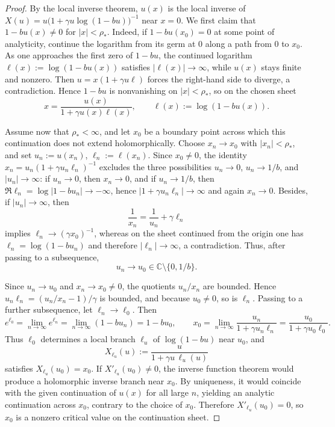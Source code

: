 \documentclass[11pt]{amsart}
\numberwithin{equation}{section}
\theoremstyle{plain}
\theoremstyle{definition}
\theoremstyle{remark}
\begin{document}
\begin{proof}
By the local inverse theorem, \(u(x)\) is the local inverse of
\(X(u)=u\bigl(1+\gamma u\log(1-bu)\bigr)^{-1}\) near \(x=0\).
We first claim that \(1-bu(x)\neq0\) for \(|x|<\rho_*\).
Indeed, if \(1-bu(x_0)=0\) at some point of analyticity, continue the logarithm from its germ at
\(0\) along a path from \(0\) to \(x_0\). As one approaches the first zero of \(1-bu\),
the continued logarithm \(\ell(x):=\log(1-bu(x))\) satisfies \(|\ell(x)|\to\infty\), while
\(u(x)\) stays finite and nonzero. Then
\(u=x(1+\gamma u\ell)\) forces the right-hand side to diverge, a contradiction.
Hence \(1-bu\) is nonvanishing on \(|x|<\rho_*\), so on the chosen sheet
\[
x=\frac{u(x)}{1+\gamma u(x)\ell(x)},\qquad \ell(x):=\log(1-bu(x)).
\]

Assume now that \(\rho_*<\infty\), and let \(x_0\) be a boundary point across which this
continuation does not extend holomorphically. Choose \(x_n\to x_0\) with \(|x_n|<\rho_*\), and set
\(u_n:=u(x_n)\), \(\ell_n:=\ell(x_n)\). Since \(x_0\neq0\), the identity
\(x_n=u_n(1+\gamma u_n\ell_n)^{-1}\) excludes the three possibilities
\(u_n\to0\), \(u_n\to1/b\), and \(|u_n|\to\infty\): if \(u_n\to0\), then \(x_n\to0\), and if
\(u_n\to1/b\), then \(\Re \ell_n=\log|1-bu_n|\to-\infty\), hence
\(|1+\gamma u_n\ell_n|\to\infty\) and again \(x_n\to0\). Besides, if \(|u_n|\to\infty\), then
\[
\frac1{x_n}=\frac1{u_n}+\gamma\ell_n
\]
implies \(\ell_n\to(\gamma x_0)^{-1}\), whereas on the sheet continued from the origin one has
\(\ell_n=\log(1-bu_n)\) and therefore \(|\ell_n|\to\infty\), a contradiction.
Thus, after passing to a subsequence,
\[
u_n\to u_0\in\mathbb C\setminus\{0,1/b\}.
\]

Since \(u_n\to u_0\) and \(x_n\to x_0\neq0\), the quotients \(u_n/x_n\) are bounded. Hence
\(u_n\ell_n=(u_n/x_n-1)/\gamma\) is bounded, and because \(u_0\neq0\), so is \(\ell_n\).
Passing to a further subsequence, let \(\ell_n\to\ell_0\). Then
\[
e^{\ell_0}=\lim_{n\to\infty}e^{\ell_n}=\lim_{n\to\infty}(1-bu_n)=1-bu_0,
\qquad
x_0=\lim_{n\to\infty}\frac{u_n}{1+\gamma u_n\ell_n}
=\frac{u_0}{1+\gamma u_0\ell_0}.
\]
Thus \(\ell_0\) determines a local branch \(\ell_u\) of \(\log(1-bu)\) near \(u_0\), and
\[
X_{\ell_u}(u):=\frac{u}{1+\gamma u\,\ell_u(u)}
\]
satisfies \(X_{\ell_u}(u_0)=x_0\). If \(X'_{\ell_u}(u_0)\neq0\), the inverse function theorem
would produce a holomorphic inverse branch near \(x_0\). By uniqueness, it would coincide with
the given continuation of \(u(x)\) for all large \(n\), yielding an analytic continuation across
\(x_0\), contrary to the choice of \(x_0\). Therefore \(X'_{\ell_u}(u_0)=0\), so \(x_0\) is a
nonzero critical value on the continuation sheet.
\end{proof}
\end{document}
